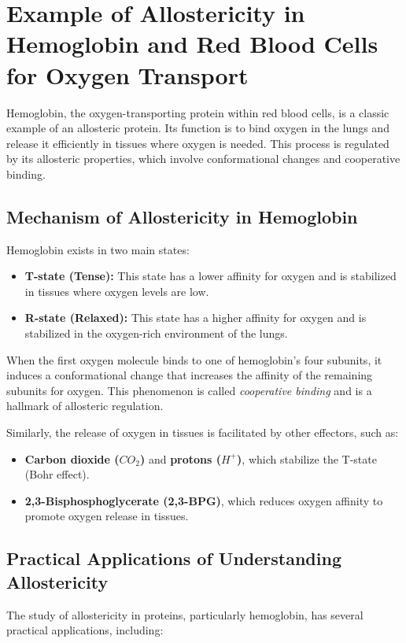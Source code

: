 \documentclass[English, Lau, oneside]{sapthesis}
\begin{document}
\section{Example of Allostericity in Hemoglobin and Red Blood Cells for Oxygen Transport}

Hemoglobin, the oxygen-transporting protein within red blood cells, is a classic example of an allosteric protein. Its function is to bind oxygen in the lungs and release it efficiently in tissues where oxygen is needed. This process is regulated by its allosteric properties, which involve conformational changes and cooperative binding.

\subsection{Mechanism of Allostericity in Hemoglobin}
Hemoglobin exists in two main states:\cite{ref7}
\begin{itemize}
    \item \textbf{T-state (Tense):} This state has a lower affinity for oxygen and is stabilized in tissues where oxygen levels are low.
    \item \textbf{R-state (Relaxed):} This state has a higher affinity for oxygen and is stabilized in the oxygen-rich environment of the lungs.
\end{itemize}

When the first oxygen molecule binds to one of hemoglobin's four subunits, it induces a conformational change that increases the affinity of the remaining subunits for oxygen. This phenomenon is called \textit{cooperative binding} and is a hallmark of allosteric regulation.

Similarly, the release of oxygen in tissues is facilitated by other effectors, such as:
\begin{itemize}
    \item \textbf{Carbon dioxide (\(CO_2\))} and \textbf{protons (\(H^+\))}, which stabilize the T-state (Bohr effect).
    \item \textbf{2,3-Bisphosphoglycerate (2,3-BPG)}, which reduces oxygen affinity to promote oxygen release in tissues.
\end{itemize}

\subsection{Practical Applications of Understanding Allostericity}
The study of allostericity in proteins, particularly hemoglobin, has several practical applications, including:
\end{document}
